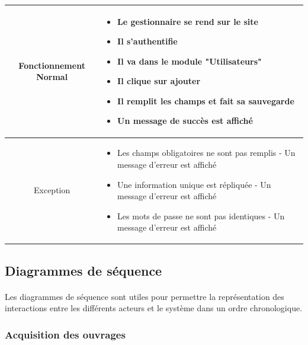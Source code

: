 \par 
\begin{tabular}{|c|p{7cm}|}
        \hline
        Fonctionnement Normal & \begin{itemize}
                \item Le gestionnaire se rend sur le site
                \item Il s'authentifie
                \item Il va dans le module "Utilisateurs"
                \item Il clique sur ajouter
                \item Il remplit les champs et fait sa sauvegarde
                \item Un message de succès est affiché
        \end{itemize} \\
        \hline
        Exception & \begin{itemize}
                \item Les champs obligatoires ne sont pas remplis - Un message d'erreur est affiché
                \item Une information unique est répliquée - Un message d'erreur est affiché
                \item Les mots de passe ne sont pas identiques - Un message d'erreur est affiché
        \end{itemize} \\
        \hline
\end{tabular}

\subsection{Diagrammes de séquence}
\paragraph{} 
Les diagrammes de séquence sont utiles pour permettre la représentation des interactions 
entre les différents acteurs et le système dans un ordre chronologique.
\subsubsection{Acquisition des ouvrages} 

